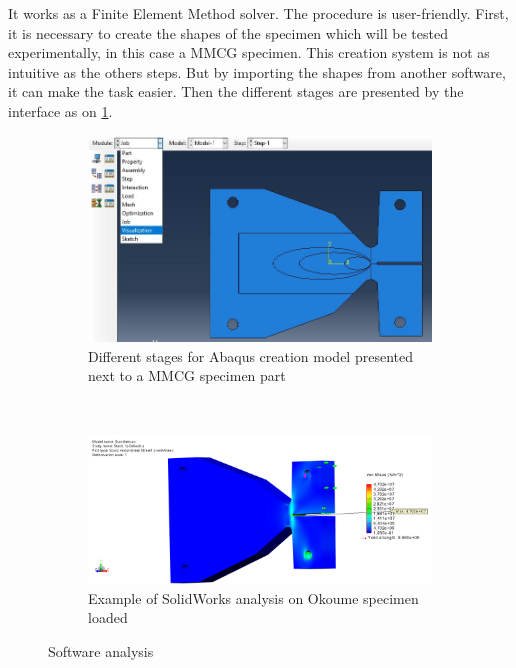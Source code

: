It works as a Finite Element Method solver. The procedure is user-friendly. First, it is necessary to create the shapes of the specimen which will be tested experimentally, in this case a MMCG specimen. This creation system is not as intuitive as the others steps. But by importing the shapes from another software, it can make the task easier. Then the different stages are presented by the interface as on \ref{fig:Abaqus_interface}.
\begin{figure}[th]
\centering
\begin{subfigure}{0.48\linewidth}
\centering
\includegraphics[scale=0.5]{Figures/Abaqus_fct}
\decoRule
\caption[Abaqus interface]{Different stages for Abaqus creation model presented next to a MMCG specimen part}
\label{fig:Abaqus_interface}
\end{subfigure}
\\
\begin{subfigure}{0.48\linewidth}
\centering
\includegraphics[scale=0.35]{Figures/SolidWorks}
\decoRule
\caption[SolidWorks analysis of Okoume specimen]{Example of SolidWorks analysis on Okoume specimen loaded }
\label{fig:SolidWorks}
\end{subfigure}
\caption[Software analysis]{Software analysis}
\label{fig:Softwares}
\end{figure}

